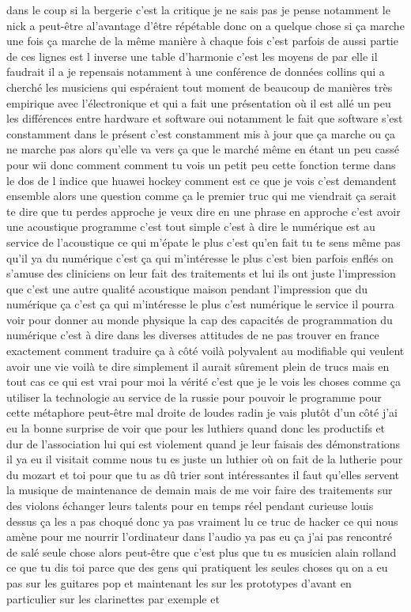 dans le coup si la bergerie c'est la critique je ne sais pas je pense notamment le nick a peut-être al'avantage d'être répétable donc on a quelque chose si ça marche une fois ça marche de la même manière à chaque fois c'est parfois de aussi partie de ces lignes est l inverse une table d'harmonie c'est les moyens de par elle il faudrait il a je repensais notamment à une conférence de données collins qui a cherché les musiciens qui espéraient tout moment de beaucoup de manières très empirique avec l'électronique et qui a fait une présentation où il est allé un peu les différences entre hardware et software oui notamment le fait que software s'est constamment dans le présent c'est constamment mis à jour que ça marche ou ça ne marche pas alors qu'elle va vers ça que le marché même en étant un peu cassé pour wii donc comment comment tu vois un petit peu cette fonction terme dans le dos de l indice que huawei hockey comment est ce que je vois c'est demandent ensemble alors une question comme ça le premier truc qui me viendrait ça serait te dire que tu perdes approche je veux dire en une phrase en approche c'est avoir une acoustique programme c'est tout simple c'est à dire le numérique est au service de l'acoustique ce qui m'épate le plus c'est qu'en fait tu te sens même pas qu'il ya du numérique c'est ça qui m'intéresse le plus c'est bien parfois enflés on s'amuse des cliniciens on leur fait des traitements et lui ils ont juste 
l'impression que c'est une autre qualité acoustique maison pendant l'impression que du numérique ça c'est ça qui m'intéresse le plus c'est numérique le service il pourra voir pour donner au monde physique la cap des capacités de programmation du numérique c'est à dire dans les diverses attitudes de ne pas trouver en france exactement comment traduire ça à côté voilà polyvalent au modifiable qui veulent avoir une vie voilà te dire simplement il aurait sûrement plein de trucs mais en tout cas ce qui est vrai pour moi la vérité c'est que je le vois les choses comme ça utiliser la technologie au service de la russie pour pouvoir le programme pour cette métaphore peut-être mal droite de loudes radin je vais plutôt d'un côté j'ai eu la bonne surprise de voir que pour les luthiers quand donc les productifs et dur de l'association lui qui est violement quand je leur faisais des démonstrations il ya eu il visitait comme nous tu es juste un luthier où on fait de la lutherie pour du mozart et toi pour que tu as dû trier sont intéressantes il faut qu'elles servent la musique de maintenance de demain mais de me voir faire des traitements sur des violons échanger leurs talents pour en temps réel pendant curieuse louis dessus ça les a pas choqué donc ya pas vraiment lu ce truc de hacker ce qui nous amène pour me nourrir l'ordinateur dans l'audio ya pas eu ça j'ai pas rencontré de salé seule chose alors peut-être que c'est plus que tu es musicien alain rolland ce que tu dis toi parce que des gens qui pratiquent les seules choses qu on a eu pas sur les guitares pop et maintenant les sur les prototypes d'avant en particulier sur les clarinettes par exemple et 
